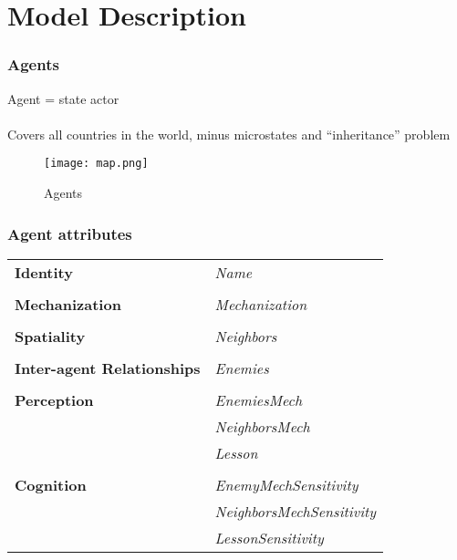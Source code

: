 \documentclass{beamer}
\begin{document}
\section{Model Description}

\begin{frame}
	\frametitle{Agents}
	Agent = state actor \\~\\

	Covers all countries in the world, minus microstates and ``inheritance'' problem

	\begin{figure}[h!]
		\centering
		\caption{Agents}
		\texttt{[image: map.png]}
	\end{figure}
\end{frame}

\begin{frame}
	\frametitle{Agent attributes}
	\begin{table}[h]
		\centering
		\begin{tabular}{|l l|}
			\hline
			\textbf{Identity} & \textit{Name} \\
			& \\
			\textbf{Mechanization} & \textit{Mechanization} \\
			& \\
			\textbf{Spatiality} & \textit{Neighbors} \\
			& \\
			\textbf{Inter-agent Relationships} & \textit{Enemies} \\
			& \\
			\textbf{Perception} & \textit{EnemiesMech} \\
			& \textit{NeighborsMech} \\
			& \textit{Lesson} \\
			& \\
			\textbf{Cognition} & \textit{EnemyMechSensitivity} \\
			& \textit{NeighborsMechSensitivity} \\
			& \textit{LessonSensitivity} \\
			\hline
		\end{tabular}
	\end{table}
\end{frame}
\end{document}

